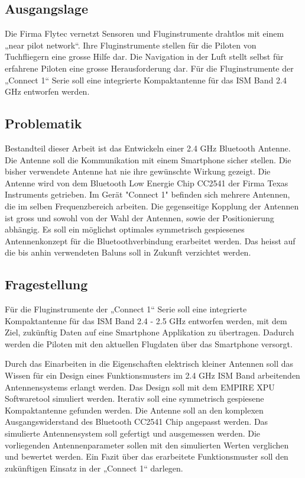 \subsection{Ausgangslage}
Die Firma Flytec vernetzt Sensoren und Fluginstrumente drahtlos mit einem  „near pilot network“. Ihre Fluginstrumente stellen für die Piloten von Tuchfliegern eine grosse Hilfe dar. Die Navigation in der Luft stellt selbst für erfahrene Piloten eine grosse Herausforderung dar. Für die Fluginstrumente der „Connect 1“ Serie  soll eine integrierte Kompaktantenne für das ISM Band 2.4 GHz entworfen werden. 

\subsection{Problematik}
Bestandteil dieser Arbeit ist das Entwickeln einer 2.4 GHz Bluetooth Antenne. Die Antenne soll die Kommunikation mit einem Smartphone sicher stellen. Die bisher verwendete Antenne hat nie ihre gewünschte Wirkung gezeigt. Die Antenne wird von dem Bluetooth Low Energie Chip CC2541 der Firma Texas Instruments getrieben. Im Gerät "Connect 1" befinden sich mehrere Antennen, die im selben Frequenzbereich arbeiten. Die gegenseitige Kopplung der Antennen ist gross und sowohl  von der Wahl der Antennen, sowie der Positionierung abhängig. Es soll ein möglichst optimales symmetrisch gespiesenes Antennenkonzept für die Bluetoothverbindung erarbeitet werden. Das heisst auf die bis anhin verwendeten Baluns soll in Zukunft verzichtet werden.
\subsection{Fragestellung}
Für die Fluginstrumente der „Connect 1“ Serie  soll eine integrierte Kompaktantenne für das ISM Band 2.4 - 2.5 GHz entworfen werden, mit dem Ziel, zukünftig Daten auf eine Smartphone Applikation zu übertragen. Dadurch werden die Piloten mit den aktuellen Flugdaten über das Smartphone  versorgt. 

Durch das Einarbeiten in die Eigenschaften elektrisch kleiner Antennen soll das Wissen für ein Design eines Funktionsmusters  im 2.4 GHz ISM Band arbeitenden Antennensystems erlangt werden. Das Design soll mit dem EMPIRE XPU Softwaretool simuliert werden. Iterativ soll eine symmetrisch gespiesene Kompaktantenne gefunden werden. Die Antenne soll an den komplexen Ausgangswiderstand des Bluetooth CC2541 Chip angepasst werden. Das simulierte Antennensystem soll gefertigt und ausgemessen werden. Die vorliegenden Antennenparameter sollen mit den simulierten Werten verglichen und bewertet werden. Ein Fazit über das erarbeitete Funktionsmuster soll den zukünftigen Einsatz in der „Connect 1“ darlegen.
